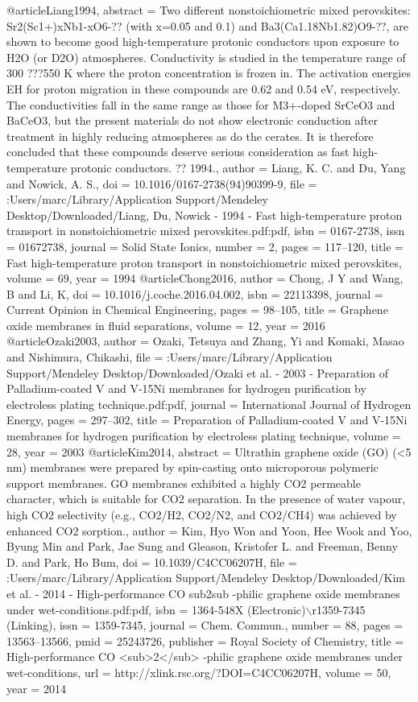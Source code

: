 @article{Liang1994,
abstract = {Two different nonstoichiometric mixed perovskites: Sr2(Sc1+)xNb1-xO6-?? (with x=0.05 and 0.1) and Ba3(Ca1.18Nb1.82)O9-??, are shown to become good high-temperature protonic conductors upon exposure to H2O (or D2O) atmospheres. Conductivity is studied in the temperature range of 300 ???550 K where the proton concentration is frozen in. The activation energies EH for proton migration in these compounds are 0.62 and 0.54 eV, respectively. The conductivities fall in the same range as those for M3+-doped SrCeO3 and BaCeO3, but the present materials do not show electronic conduction after treatment in highly reducing atmospheres as do the cerates. It is therefore concluded that these compounds deserve serious consideration as fast high-temperature protonic conductors. ?? 1994.},
author = {Liang, K. C. and Du, Yang and Nowick, A. S.},
doi = {10.1016/0167-2738(94)90399-9},
file = {:Users/marc/Library/Application Support/Mendeley Desktop/Downloaded/Liang, Du, Nowick - 1994 - Fast high-temperature proton transport in nonstoichiometric mixed perovskites.pdf:pdf},
isbn = {0167-2738},
issn = {01672738},
journal = {Solid State Ionics},
number = {2},
pages = {117--120},
title = {{Fast high-temperature proton transport in nonstoichiometric mixed perovskites}},
volume = {69},
year = {1994}
}
@article{Chong2016,
author = {Chong, J Y and Wang, B and Li, K},
doi = {10.1016/j.coche.2016.04.002},
isbn = {22113398},
journal = {Current Opinion in Chemical Engineering},
pages = {98--105},
title = {{Graphene oxide membranes in fluid separations}},
volume = {12},
year = {2016}
}
@article{Ozaki2003,
author = {Ozaki, Tetsuya and Zhang, Yi and Komaki, Masao and Nishimura, Chikashi},
file = {:Users/marc/Library/Application Support/Mendeley Desktop/Downloaded/Ozaki et al. - 2003 - Preparation of Palladium-coated V and V-15Ni membranes for hydrogen purification by electroless plating technique.pdf:pdf},
journal = {International Journal of Hydrogen Energy},
pages = {297--302},
title = {{Preparation of Palladium-coated V and V-15Ni membranes for hydrogen purification by electroless plating technique}},
volume = {28},
year = {2003}
}
@article{Kim2014,
abstract = {Ultrathin graphene oxide (GO) ({\textless}5 nm) membranes were prepared by spin-casting onto microporous polymeric support membranes. GO membranes exhibited a highly CO2 permeable character, which is suitable for CO2 separation. In the presence of water vapour, high CO2 selectivity (e.g., CO2/H2, CO2/N2, and CO2/CH4) was achieved by enhanced CO2 sorption.},
author = {Kim, Hyo Won and Yoon, Hee Wook and Yoo, Byung Min and Park, Jae Sung and Gleason, Kristofer L. and Freeman, Benny D. and Park, Ho Bum},
doi = {10.1039/C4CC06207H},
file = {:Users/marc/Library/Application Support/Mendeley Desktop/Downloaded/Kim et al. - 2014 - High-performance CO sub2sub -philic graphene oxide membranes under wet-conditions.pdf:pdf},
isbn = {1364-548X (Electronic)$\backslash$r1359-7345 (Linking)},
issn = {1359-7345},
journal = {Chem. Commun.},
number = {88},
pages = {13563--13566},
pmid = {25243726},
publisher = {Royal Society of Chemistry},
title = {{High-performance CO {\textless}sub{\textgreater}2{\textless}/sub{\textgreater} -philic graphene oxide membranes under wet-conditions}},
url = {http://xlink.rsc.org/?DOI=C4CC06207H},
volume = {50},
year = {2014}
}
